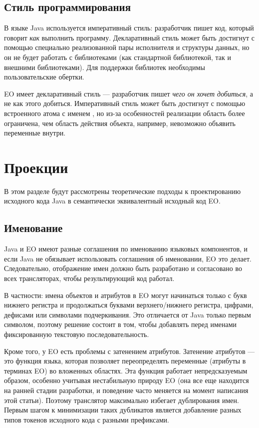\documentclass[oneside,final,14pt,a4paper]{extreport}
\theoremstyle{definition}
\theoremstyle{remark}
\theoremstyle{remark}
\begin{document}
\subsection{Стиль программирования}
В языке Java используется императивный стиль: разработчик пишет код, который говорит \emph{как} выполнить программу. Декларативный стиль может быть достигнут с помощью специально реализованной пары исполнителя и структуры данных, но он не будет работать с библиотеками (как стандартной библиотекой, так и внешними библиотеками). Для поддержки библиотек необходимы пользовательские обертки.

EO имеет декларативный стиль --- разработчик пишет \emph{чего он хочет добиться}, а не как этого добиться. Императивный стиль может быть достигнут с помощью встроенного атома с именем , но из-за особенностей реализации область  более ограничена, чем область действия объекта, например, невозможно объявить переменные внутри.


\section{Проекции}

В этом разделе будут рассмотрены теоретические подходы к проектированию исходного кода Java в семантически эквивалентный исходный код EO.

\subsection{Именование}
Java и EO имеют разные соглашения по именованию языковых компонентов, и если Java не обязывает использовать соглашения об именовании, EO это делает. Следовательно, отображение имен должно быть разработано и согласовано во всех трансляторах, чтобы результирующий код работал.

В частности: имена объектов и атрибутов в EO могут начинаться только с букв нижнего регистра и продолжаться буквами верхнего/нижнего регистра, цифрами, дефисами или символами подчеркивания. Это отличается от Java только первым символом, поэтому решение состоит в том, чтобы добавлять перед именами фиксированную текстовую последовательность.

Кроме того, у EO есть проблемы с затенением атрибутов. Затенение атрибутов — это функция языка, которая позволяет переопределять переменные (атрибуты в терминах EO) во вложенных областях. Эта функция работает непредсказуемым образом, особенно учитывая нестабильную природу EO (она все еще находится на ранней стадии разработки, и поведение часто меняется на момент написания этой статьи). Поэтому транслятор максимально избегает дублирования имен. Первым шагом к минимизации таких дубликатов является добавление разных типов токенов исходного кода с разными префиксами.
\end{document}
